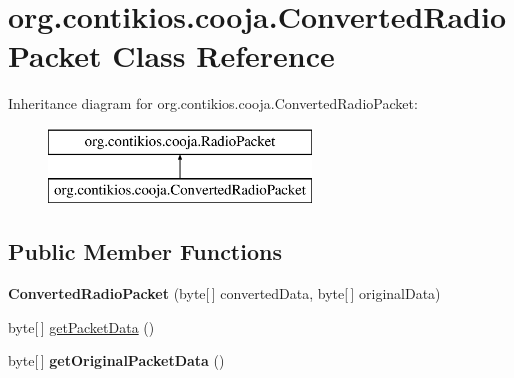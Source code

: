 \hypertarget{classorg_1_1contikios_1_1cooja_1_1ConvertedRadioPacket}{\section{org.\-contikios.\-cooja.\-Converted\-Radio\-Packet Class Reference}
\label{classorg_1_1contikios_1_1cooja_1_1ConvertedRadioPacket}
}
Inheritance diagram for org.\-contikios.\-cooja.\-Converted\-Radio\-Packet\-:\begin{figure}[H]
\begin{center}
\leavevmode
\includegraphics[height=2.000000cm]{classorg_1_1contikios_1_1cooja_1_1ConvertedRadioPacket}
\end{center}
\end{figure}
\subsection*{Public Member Functions}
\begin{DoxyCompactItemize}
\item 
\hypertarget{classorg_1_1contikios_1_1cooja_1_1ConvertedRadioPacket_a0a0b33a24aa62e24155260d2ebadbcf3}{{\bfseries Converted\-Radio\-Packet} (byte\mbox{[}$\,$\mbox{]} converted\-Data, byte\mbox{[}$\,$\mbox{]} original\-Data)}\label{classorg_1_1contikios_1_1cooja_1_1ConvertedRadioPacket_a0a0b33a24aa62e24155260d2ebadbcf3}

\item 
byte\mbox{[}$\,$\mbox{]} \hyperlink{classorg_1_1contikios_1_1cooja_1_1ConvertedRadioPacket_a2038c34dfd7e55daad454f8c34ddb33e}{get\-Packet\-Data} ()
\item 
\hypertarget{classorg_1_1contikios_1_1cooja_1_1ConvertedRadioPacket_a55d4161b57b17dec82908e7a7adc3f60}{byte\mbox{[}$\,$\mbox{]} {\bfseries get\-Original\-Packet\-Data} ()}\label{classorg_1_1contikios_1_1cooja_1_1ConvertedRadioPacket_a55d4161b57b17dec82908e7a7adc3f60}

\end{DoxyCompactItemize}


